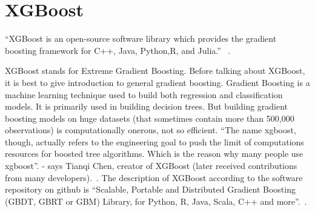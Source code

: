 \section{XGBoost} 

``XGBoost is an open-source software library which provides the
gradient boosting framework for C++, Java, Python,R, and Julia.''
~\cite{hid-sp18-401-XGBoost-wiki}.

XGBoost stands for Extreme Gradient Boosting. Before talking about
XGBoost, it is best to give introduction to general gradient
boosting. Gradient Boosting is a machine learning technique used to
build both regression and classification models. It is primarily used
in building decision trees. But building gradient boosting models on
huge datasets (that sometimes contain more than 500,000 observations)
is computationally onerous, not so efficient.  ``The name xgboost,
though, actually refers to the engineering goal to push the limit of
computations resources for boosted tree algorithms. Which is the
reason why many people use xgboost''.  - says Tianqi Chen, creator of
XGBoost (later received contributions from many
developers).~\cite{hid-sp18-401-XGBoost-gen}. The description of
XGBoost according to the software repository on github is ``Scalable,
Portable and Distributed Gradient Boosting (GBDT, GBRT or GBM)
Library, for Python, R, Java, Scala, C++ and
more''.~\cite{hid-sp18-401-XGBoost-git}.
